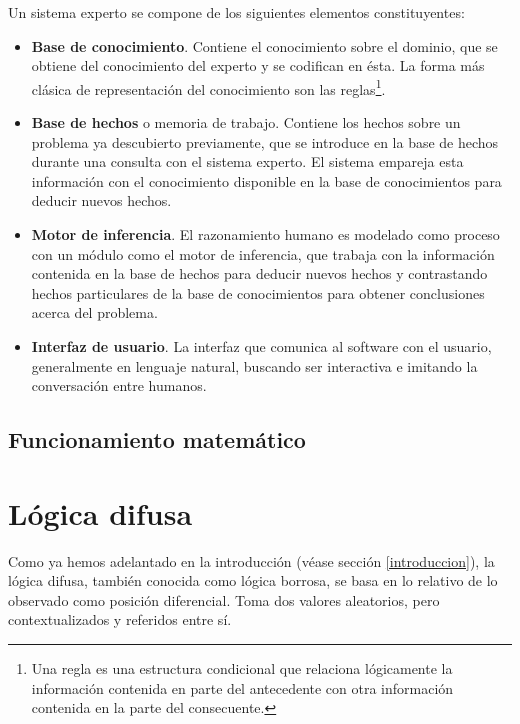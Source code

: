 \documentclass[a4paper, 11pt, titlepage]{article}
\begin{document}
        Un sistema experto se compone de los siguientes elementos constituyentes:

        \begin{itemize}
            \item \textbf{Base de conocimiento}. Contiene el conocimiento sobre el 
            dominio, que se obtiene del conocimiento del experto y se codifican en ésta.
            La forma más clásica de representación del conocimiento son las reglas\footnote{
                Una regla es una estructura condicional que relaciona lógicamente la 
                información contenida en parte del antecedente con otra información 
                contenida en la parte del consecuente.
            }.
            \item \textbf{Base de hechos} o memoria de trabajo. Contiene los hechos sobre 
            un problema ya descubierto previamente, que se introduce en la base de hechos 
            durante una consulta con el sistema experto. El sistema empareja esta información  
            con el conocimiento disponible en la base de conocimientos para deducir nuevos 
            hechos.
            \item \textbf{Motor de inferencia}. El razonamiento humano es modelado como proceso 
            con un módulo como el motor de inferencia, que trabaja con la información contenida 
            en la base de hechos para deducir nuevos hechos y contrastando hechos particulares 
            de la base de conocimientos para obtener conclusiones acerca del problema.
            \item \textbf{Interfaz de usuario}. La interfaz que comunica al software con el usuario, 
            generalmente en lenguaje natural, buscando ser interactiva e imitando la conversación
            entre humanos.
        \end{itemize}
        
    \subsection{Funcionamiento matemático}


\section{Lógica difusa}

    Como ya hemos adelantado en la introducción (véase sección \ref{introduccion}), la lógica difusa, 
    también conocida como lógica borrosa, se basa en lo relativo de lo observado como posición 
    diferencial. Toma dos valores aleatorios, pero contextualizados y referidos entre sí.
\end{document}
